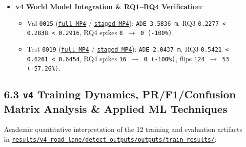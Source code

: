 \documentclass[10.5pt,a4paper]{article}
\begin{document}
\begin{itemize}[leftmargin=1.5em,itemsep=2pt]
\begin{itemize}[leftmargin=1.5em,itemsep=2pt]
\end{itemize}
\item \textbf{v4 World Model Integration \& RQ1--RQ4 Verification}:
\begin{itemize}[leftmargin=1.5em,itemsep=2pt]
\item Val \texttt{0015} (\href{https://github.com/Heisnotanimposter/Totalcare\_autonomous\_driving\_Yolov5/blob/main/results/v4\_road\_lane/world\_outputs/v4\_world\_outputs/world\_model\_0015\_full/world\_model\_demo\_0015.mp4}{\texttt{full MP4}} / \href{https://github.com/Heisnotanimposter/Totalcare\_autonomous\_driving\_Yolov5/blob/main/results/v4\_road\_lane/world\_outputs/v4\_world\_outputs/world\_model\_0015\_staged/world\_model\_demo\_0015.mp4}{\texttt{staged MP4}}): \texttt{ADE 3.\allowbreak{}5836 m}, RQ3 \texttt{0.\allowbreak{}2277 < 0.\allowbreak{}2838 < 0.\allowbreak{}2916}, RQ4 spikes \texttt{8 $\rightarrow$ 0 (-\allowbreak{}100\%)}.
\item Test \texttt{0019} (\href{https://github.com/Heisnotanimposter/Totalcare\_autonomous\_driving\_Yolov5/blob/main/results/v4\_road\_lane/world\_outputs/v4\_world\_outputs/world\_model\_0019\_full/world\_model\_demo\_0019.mp4}{\texttt{full MP4}} / \href{https://github.com/Heisnotanimposter/Totalcare\_autonomous\_driving\_Yolov5/blob/main/results/v4\_road\_lane/world\_outputs/v4\_world\_outputs/world\_model\_0019\_staged/world\_model\_demo\_0019.mp4}{\texttt{staged MP4}}): \texttt{ADE 2.\allowbreak{}0437 m}, RQ3 \texttt{0.\allowbreak{}5421 < 0.\allowbreak{}6261 < 0.\allowbreak{}6454}, RQ4 spikes \texttt{16 $\rightarrow$ 0 (-\allowbreak{}100\%)}, flips \texttt{124 $\rightarrow$ 53 (-\allowbreak{}57.\allowbreak{}26\%)}.
\end{itemize}
\end{itemize}

\subsection{6.3 \texttt{v4} Training Dynamics, PR/F1/Confusion Matrix Analysis \& Applied ML Techniques}

Academic quantitative interpretation of the 12 training and evaluation artifacts in \href{https://github.com/Heisnotanimposter/Totalcare\_autonomous\_driving\_Yolov5/tree/main/results/v4\_road\_lane/detect\_outputs/outputs/train\_results}{\texttt{results/\allowbreak{}v4\_\allowbreak{}road\_\allowbreak{}lane/\allowbreak{}detect\_\allowbreak{}outputs/\allowbreak{}outputs/\allowbreak{}train\_\allowbreak{}results/\allowbreak{}}}:
\end{document}
